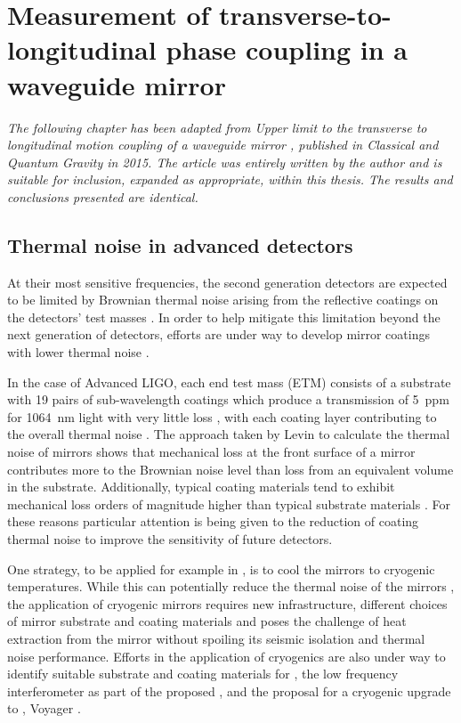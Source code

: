 \chapter{\label{c:waveguides}Measurement of transverse-to-longitudinal phase coupling in a waveguide mirror}

\emph{The following chapter has been adapted from \emph{Upper limit to the transverse to longitudinal motion coupling of a waveguide mirror \cite{Leavey2015}}, published in \emph{Classical and Quantum Gravity} in 2015. The article was entirely written by the author and is suitable for inclusion, expanded as appropriate, within this thesis. The results and conclusions presented are identical.}

\section{Thermal noise in advanced detectors}
At their most sensitive frequencies, the second generation detectors are expected to be limited by Brownian thermal noise arising from the reflective coatings on the detectors' test masses \cite{Levin1998, Nakagawa2002, Harry2002, Crooks2002}. In order to help mitigate this limitation beyond the next generation of detectors, efforts are under way to develop mirror coatings with lower thermal noise \cite{Flaminio2010, Bassiri2013}.

In the case of Advanced LIGO, each end test mass (\gls{ETM}) consists of a substrate with \num{19} pairs of sub-wavelength coatings which produce a transmission of \SI{5}{ppm} for \SI{1064}{\nano\meter} light with very little loss \cite{Dannenberg2009}, with each coating layer contributing to the overall thermal noise \cite{Harry2002, Crooks2002}. The approach taken by Levin to calculate the thermal noise of mirrors \cite{Levin1998} shows that mechanical loss at the front surface of a mirror contributes more to the Brownian noise level than loss from an equivalent volume in the substrate. Additionally, typical coating materials tend to exhibit mechanical loss orders of magnitude higher than typical substrate materials \cite{Harry2002, Crooks2002}. For these reasons particular attention is being given to the reduction of coating thermal noise to improve the sensitivity of future detectors.

One strategy, to be applied for example in \KAGRA{} \cite{Sakakibara2014}, is to cool the mirrors to cryogenic temperatures. While this can potentially reduce the thermal noise of the mirrors \cite{Uchiyama2012}, the application of cryogenic mirrors requires new infrastructure, different choices of mirror substrate and coating materials and poses the challenge of heat extraction from the mirror without spoiling its seismic isolation and thermal noise performance. Efforts in the application of cryogenics are also under way to identify suitable substrate and coating materials for \ETLF{}, the low frequency interferometer as part of the proposed \ET{} \cite{Punturo2010, Martin2010, Hild2011, Abernathy2011}, and the proposal for a cryogenic upgrade to \LIGO{}, Voyager \cite{aligoinst2015}.

